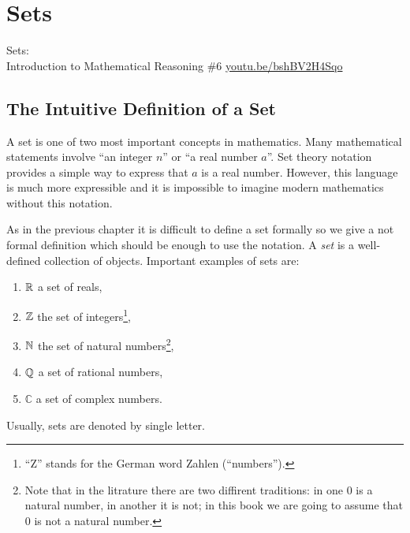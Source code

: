 \chapter{Sets}
\begin{marginfigure}
  {\scriptsize Sets:\\\noindent
  Introduction to Mathematical Reasoning \#6}
  \vskip 0.25cm
  \noindent
  \vskip 0.25cm
  \noindent
  \url{youtu.be/bshBV2H4Sqo}
\end{marginfigure}
\section{The Intuitive Definition of a Set}
A set is one of two most important concepts in mathematics. Many mathematical
statements involve ``an integer $n$'' or ``a real number $a$''. Set theory
notation provides a simple way to express that $a$ is a real number. However,
this language is much more expressible and it is impossible to imagine modern
mathematics without this notation.

As in the previous chapter it is difficult to define a set formally so we give
a not formal definition which should be enough to use the notation.
A \textit{set} is a well-defined collection of objects. Important examples of
sets are:
\begin{enumerate}
  \item $\mathbb{R}$ a set of reals,
  \item $\mathbb{Z}$ the set of integers\footnote{``Z'' stands for the German word
    Zahlen (``numbers'').},
  \item $\mathbb{N}$ the set of natural numbers\footnote{Note that in the litrature
      there are two diffirent traditions: in one $0$ is a natural number, in
      another it is not; in this book we are going to assume that $0$ is not a
      natural number.
    },
  \item $\mathbb{Q}$ a set of rational numbers,
  \item $\mathbb{C}$ a set of complex numbers.
\end{enumerate}
Usually, sets are denoted by single letter.

